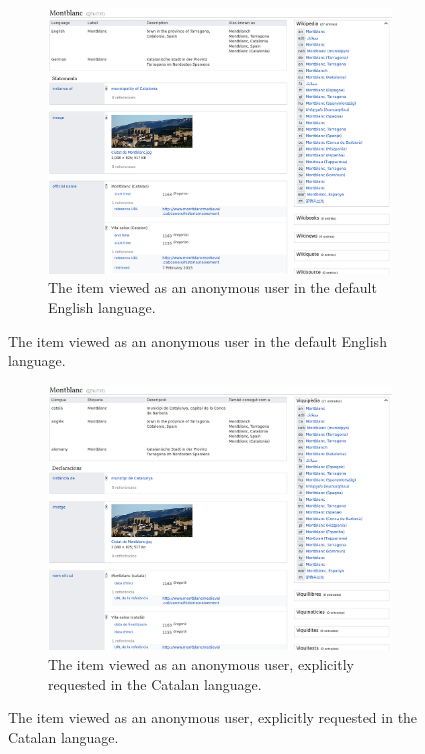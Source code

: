\begin{figure}
  \caption{Two screenshots of the same item viewed in different languages.}
  \label{fig:montblanc}
  \begin{subfigure}{\textwidth}
    \caption{The item viewed as an anonymous user in the default English language.}
    \label{fig:montblanc-en}
    \includegraphics[width=\textwidth]{screenshots/montblanc-en}
  \end{subfigure}
\end{figure}
\begin{figure}\ContinuedFloat
  \begin{subfigure}{\textwidth}
    \caption{The item viewed as an anonymous user, explicitly requested in the Catalan language.}
    \label{fig:montblanc-ca}
    \includegraphics[width=\textwidth]{screenshots/montblanc-ca}
  \end{subfigure}
\end{figure}


